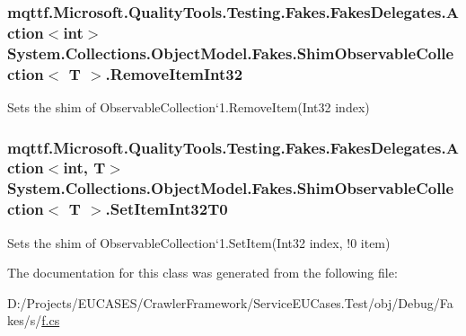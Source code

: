 \hypertarget{class_system_1_1_collections_1_1_object_model_1_1_fakes_1_1_shim_observable_collection_3_01_t_01_4_a84cad1024c17bd33c5ffc6ef4018662d}{
\subsubsection[{Remove\-Item\-Int32}]{\setlength{\rightskip}{0pt plus 5cm}mqttf.\-Microsoft.\-Quality\-Tools.\-Testing.\-Fakes.\-Fakes\-Delegates.\-Action$<$int$>$ System.\-Collections.\-Object\-Model.\-Fakes.\-Shim\-Observable\-Collection$<$ T $>$.Remove\-Item\-Int32\hspace{0.3cm}{\ttfamily [set]}}}\label{class_system_1_1_collections_1_1_object_model_1_1_fakes_1_1_shim_observable_collection_3_01_t_01_4_a84cad1024c17bd33c5ffc6ef4018662d}


Sets the shim of Observable\-Collection`1.Remove\-Item(\-Int32 index)

\hypertarget{class_system_1_1_collections_1_1_object_model_1_1_fakes_1_1_shim_observable_collection_3_01_t_01_4_a429e406140539a429fe0963cedaf88c7}{
\subsubsection[{Set\-Item\-Int32\-T0}]{\setlength{\rightskip}{0pt plus 5cm}mqttf.\-Microsoft.\-Quality\-Tools.\-Testing.\-Fakes.\-Fakes\-Delegates.\-Action$<$int, T$>$ System.\-Collections.\-Object\-Model.\-Fakes.\-Shim\-Observable\-Collection$<$ T $>$.Set\-Item\-Int32\-T0\hspace{0.3cm}{\ttfamily [set]}}}\label{class_system_1_1_collections_1_1_object_model_1_1_fakes_1_1_shim_observable_collection_3_01_t_01_4_a429e406140539a429fe0963cedaf88c7}


Sets the shim of Observable\-Collection`1.Set\-Item(Int32 index, !0 item)



The documentation for this class was generated from the following file\-:\begin{DoxyCompactItemize}
\item 
D\-:/\-Projects/\-E\-U\-C\-A\-S\-E\-S/\-Crawler\-Framework/\-Service\-E\-U\-Cases.\-Test/obj/\-Debug/\-Fakes/s/\hyperlink{s_2f_8cs}{f.\-cs}\end{DoxyCompactItemize}
